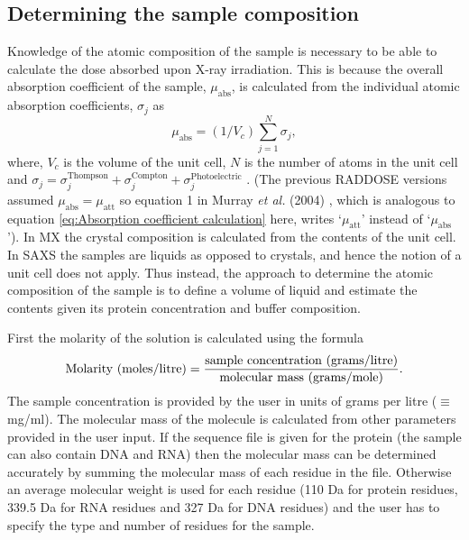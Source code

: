 \subsection{Determining the sample composition}
\label{sub:Determining the sample composition}
Knowledge of the atomic composition of the sample is necessary to be able to calculate the dose absorbed upon X-ray irradiation.
This is because the overall absorption coefficient of the sample, $\mu_{\text{abs}}$, is calculated from the individual atomic absorption coefficients, $\sigma_j$ as
\begin{equation}
    \mu_{\text{abs}} = (1/V_c) \sum_{j=1}^N \sigma_j,
    \label{eq:Absorption coefficient calculation}
\end{equation}
where, $V_c$ is the volume of the unit cell, $N$ is the number of atoms in the unit cell and $\sigma_j = \sigma_j^{\text{Thompson}} + \sigma_j^{\text{Compton}} + \sigma_j^{\text{Photoelectric}}$ \cite{murray2004}.
(The previous RADDOSE versions assumed $\mu_{\text{abs}} = \mu_{\text{att}}$ so equation 1 in Murray \textit{et al.} (2004) \nocite{murray2004}, which is analogous to equation \ref{eq:Absorption coefficient calculation} here, writes `$\mu_{\text{att}}$' instead of `$\mu_{\text{abs}}$').
In MX the crystal composition is calculated from the contents of the unit cell.
In SAXS the samples are liquids as opposed to crystals, and hence the notion of a unit cell does not apply.
Thus instead, the approach to determine the atomic composition of the sample is to define a volume of liquid and estimate the contents given its protein concentration and buffer composition.

First the molarity of the solution is calculated using the formula
\begin{equation}
    \text{Molarity (moles/litre)} = \frac{\text{sample concentration (grams/litre)}}{\text{molecular mass (grams/mole)}}.
    \label{eq:molarity calculation}
\end{equation}
The sample concentration is provided by the user in units of grams per litre ($\equiv$ mg/ml).
The molecular mass of the molecule is calculated from other parameters provided in the user input.
If the sequence file is given for the protein (the sample can also contain DNA and RNA) then the molecular mass can be determined accurately by summing the molecular mass of each residue in the file.
Otherwise an average molecular weight is used for each residue (110 Da for protein residues, 339.5 Da for RNA residues and 327 Da for DNA residues) and the user has to specify the type and number of residues for the sample.

